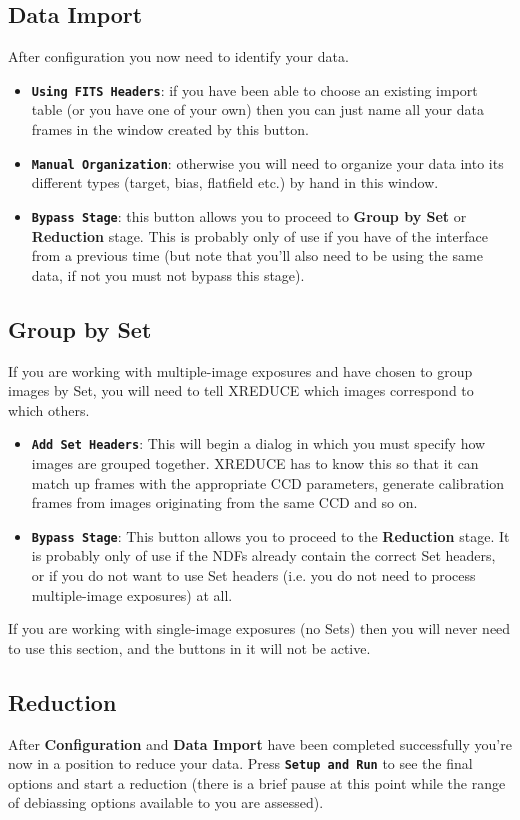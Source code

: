 \documentclass[11pt,nolof]{starlink}
\providecommand{\butt}[1]{{\bf \tt #1}}
\providecommand{\wlab}[1]{{\bf #1}}
\begin{document}
\subsection{Data Import }
After configuration you now need to identify your data.
\begin{itemize}
\item \butt{Using FITS Headers}:
if you have been able to choose an existing import table (or you have
one of your own) then you can just name all your data frames in the
window created by this button.
\item \butt{Manual Organization}:
otherwise you will need to organize your data into its different types
(target, bias, flatfield etc.) by hand in this window.
\item \butt{Bypass Stage}: this button allows you to proceed to
\wlab{Group by Set} or \wlab{Reduction} stage.
This is probably only of use if you have
of the interface from a previous time (but note that you'll also need to be
using the same data, if not you must not bypass this stage).
\end{itemize}

\subsection{Group by Set }
If you are working with multiple-image exposures and have chosen
to group images by Set, you will need to tell XREDUCE which
images correspond to which others.
\begin{itemize}
\item \butt{Add Set Headers}:
This will begin a dialog in which you must specify how images are
grouped together.  XREDUCE has to know this so that it can match up
frames with the appropriate CCD parameters, generate calibration
frames from images originating from the same CCD and so on.
\item \butt{Bypass Stage}:
This button allows you to proceed to the \wlab{Reduction} stage.
It is probably only of use if the NDFs already contain the
correct Set headers, or if you do not want to use Set headers
(i.e. you do not need to process multiple-image exposures) at all.
\end{itemize}

If you are working with single-image exposures (no Sets) then you
will never need to use this section, and the buttons in it will
not be active.

\subsection{Reduction }
After \wlab{Configuration} and \wlab{Data Import} have been completed
successfully you're now in a position to reduce your data. Press
\butt{Setup and Run} to see the final options and start a reduction
(there is a brief pause at this point while the range of debiassing
options available to you are assessed).
\end{document}
